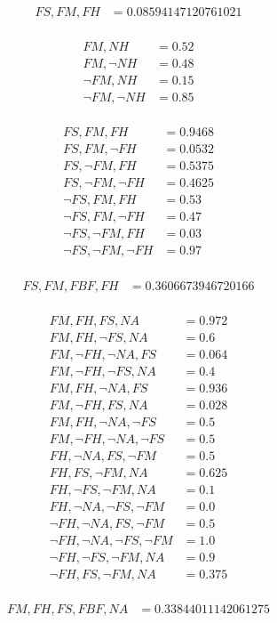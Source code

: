 \documentclass[12pt]{article}
\begin{document}
\begin{align*}
FS, FM, FH &= 0.08594147120761021 \\
\end{align*}



\problemsub
\begin{align*}
FM, NH &= 0.52 \\
FM, ¬NH &= 0.48 \\
¬FM, NH &= 0.15 \\
¬FM, ¬NH &= 0.85 \\
\end{align*}

\begin{align*}
FS, FM, FH &= 0.9468 \\
FS, FM, ¬FH &= 0.0532 \\
FS, ¬FM, FH &= 0.5375 \\
FS, ¬FM, ¬FH &= 0.4625 \\
¬FS, FM, FH &= 0.53 \\
¬FS, FM, ¬FH &= 0.47 \\
¬FS, ¬FM, FH &= 0.03 \\
¬FS, ¬FM, ¬FH &= 0.97 \\
\end{align*}

\begin{align*}
FS, FM, FBF, FH &= 0.3606673946720166 \\
\end{align*}



\problemsub
\begin{align*}
FM, FH, FS, NA &= 0.972 \\
FM, FH, ¬FS, NA &= 0.6 \\
FM, ¬FH, ¬NA, FS &= 0.064 \\
FM, ¬FH, ¬FS, NA &= 0.4 \\
FM, FH, ¬NA, FS &= 0.936 \\
FM, ¬FH, FS, NA &= 0.028 \\
FM, FH, ¬NA, ¬FS &= 0.5 \\
FM, ¬FH, ¬NA, ¬FS &= 0.5 \\
FH, ¬NA, FS, ¬FM &= 0.5 \\
FH, FS, ¬FM, NA &= 0.625 \\
FH, ¬FS, ¬FM, NA &= 0.1 \\
FH, ¬NA, ¬FS, ¬FM &= 0.0 \\
¬FH, ¬NA, FS, ¬FM &= 0.5 \\
¬FH, ¬NA, ¬FS, ¬FM &= 1.0 \\
¬FH, ¬FS, ¬FM, NA &= 0.9 \\
¬FH, FS, ¬FM, NA &= 0.375 \\
\end{align*}

\begin{align*}
FM, FH, FS, FBF, NA &= 0.33844011142061275 \\
\end{align*}
\end{document}
